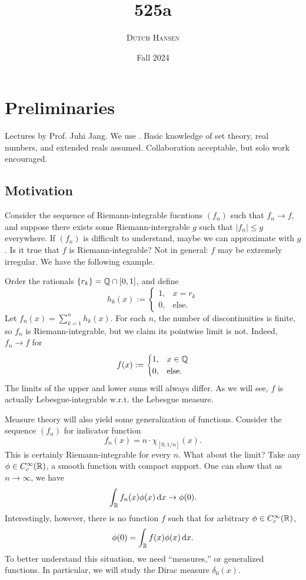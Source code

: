 \documentclass[12pt]{article} %
\title{525a}
\author{\textsc{Dutch Hansen}}
\date{\normalsize{Fall 2024}}
\begin{document}
\maketitle

\pagebreak

\tableofcontents

\pagebreak

\section{Preliminaries}

Lectures by Prof. Juhi Jang. We use \cite{folland1999real}. Basic knowledge of set theory, real numbers, and extended reals assumed. Collaboration acceptable, but solo work encouraged.

\subsection{Motivation}

\begin{example}
    Consider the sequence of Riemann-integrable fucntions $(f_n)$ such that $f_n \to f$, and suppose there exists some Riemann-intergrable $g$ such that $|f_n| \leq g$ everywhere. If $(f_n)$ is difficult to understand, maybe we can approximate with $g$. Is it true that $f$ is Riemann-integrable? Not in general: $f$ may be extremely irregular. We have the following example. 

    Order the rationals $\{r_k\} = \mathbb{Q} \cap [0,1]$, and define \[h_k(x) := \begin{cases}
        1, &x = r_k\\
        0, &\text{else}.
    \end{cases}\] Let $f_n(x) = \sum_{k=1}^{n} h_k(x)$. For each $n$, the number of discontinuities is finite, so $f_n$ is Riemann-integrable, but we claim its pointwise limit is not. Indeed, $f_n \to f$ for \[f(x) := \begin{cases}
        1, &x \in \mathbb{Q}\\
        0, &\text{else}.
    \end{cases}\] The limits of the upper and lower sums will always differ. As we will see, $f$ is actually Lebesgue-integrable w.r.t. the Lebesgue measure. 
\end{example}

\begin{example}
    Measure theory will also yield some generalization of functions. Consider the sequence $(f_n)$ for indicator function \[f_n(x) = n \cdot \chi_{[0, 1/n]}(x).\] This is certainly Riemann-integrable for every $n$. What about the limit? Take any $\phi \in C_c^{\infty}(\mathbb{R})$, a smooth function with compact support. One can show that as $n \to \infty$, we have \[\int_{\mathbb{R}} f_n(x) \phi(x) \, \mathrm{d} x \to \phi(0).\] Interestingly, however, there is no function $f$ such that for arbitrary $\phi \in C_c^{\infty}(\mathbb{R})$, \[\phi(0) = \int_{\mathbb{R}} f(x) \phi(x) \, \mathrm{d} x.\] To better understand this situation, we need ``measures,'' or generalized functions. In particular, we will study the Dirac measure $\delta_0(x)$.
\end{example}
\end{document}
